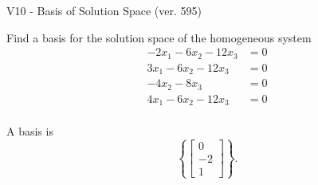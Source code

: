 \begin{exercise}
  \begin{exerciseTitle}V10 - Basis of Solution Space (ver. 595)\end{exerciseTitle}
  \begin{exerciseStatement}
    Find a basis for the solution space of the homogeneous system 
\begin{align*}
 -2 x_ 1 -6 x_ 2 -12 x_ 3 &= 0  \\ 
  3 x_ 1 -6 x_ 2 -12 x_ 3 &= 0  \\ 
  -4 x_ 2 -8 x_ 3 &= 0  \\ 
  4 x_ 1 -6 x_ 2 -12 x_ 3 &= 0  \\ 
 \end{align*}


 
  \end{exerciseStatement}

  \begin{exerciseAnswer}
   A basis is   
\[\left\{\left[\begin{array}{c}
0 \\
-2 \\
1
\end{array}\right]\right\}.\]

  


  \end{exerciseAnswer}
\end{exercise}